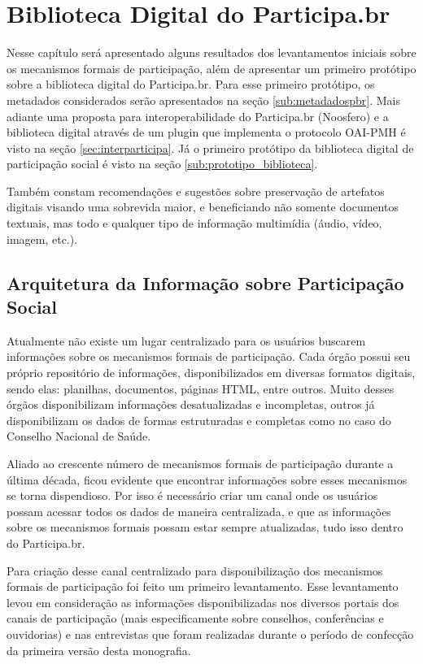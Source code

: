 \chapter{Biblioteca Digital do Participa.br}
\label{cap:bibparticipabr}

Nesse capítulo será apresentado alguns resultados dos levantamentos iniciais sobre os mecanismos formais de participação, além de apresentar um primeiro protótipo sobre a biblioteca digital do Participa.br. Para esse primeiro protótipo, os metadados considerados serão apresentados na seção \ref{sub:metadadospbr}. Mais adiante uma proposta para interoperabilidade do Participa.br (Noosfero) e a biblioteca digital através de um plugin que implementa o protocolo OAI-PMH é visto na seção \ref{sec:interparticipa}. Já o primeiro protótipo da biblioteca digital de participação social é visto na seção \ref{sub:prototipo_biblioteca}.

Também constam recomendações e sugestões sobre preservação de artefatos digitais visando uma sobrevida maior, e beneficiando não somente documentos textuais, mas todo e qualquer tipo de informação multimídia (áudio, vídeo, imagem, etc.).

\section{Arquitetura da Informação sobre Participação Social}

Atualmente não existe um lugar centralizado para os usuários buscarem informações sobre os mecanismos formais de participação. Cada órgão possui seu próprio repositório de informações, disponibilizados em diversas formatos digitais, sendo elas: planilhas, documentos, páginas HTML, entre outros. Muito desses órgãos disponibilizam informações desatualizadas e incompletas, outros já disponibilizam os dados de formas estruturadas e completas como no caso do Conselho Nacional de Saúde. 

Aliado ao crescente número de mecanismos formais de participação durante a última década, ficou evidente que encontrar informações sobre esses mecanismos se torna dispendioso. Por isso é necessário criar um canal onde os usuários possam acessar todos os dados de maneira centralizada, e que as informações sobre os mecanismos formais possam estar sempre atualizadas, tudo isso dentro do Participa.br.

Para criação desse canal centralizado para disponibilização dos mecanismos formais de participação foi feito um primeiro levantamento. Esse levantamento levou em consideração as informações disponibilizadas nos diversos portais dos canais de participação (mais especificamente sobre conselhos, conferências e ouvidorias) e nas entrevistas que foram realizadas durante o período de confecção da primeira versão desta monografia.

